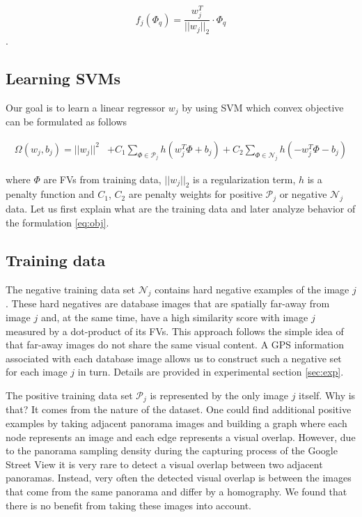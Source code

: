 \documentclass[table]{article} %
\newcommand\norm[1]{||#1||_2}
\begin{document}
    \begin{equation}
    	f_j(\Phi_q)=\dfrac{w_j^T}{\norm{w_j}}\cdot \Phi_q
    	\label{eq:linreg}
    \end{equation}
    .

    \subsection{Learning SVMs}

    	 Our goal is to learn a linear regressor $w_j$ by using SVM which convex objective can be formulated as follows

    	\begin{align}
	        \Omega(w_j,b_j)=||w_j||^{2}& +C_1\sum_{\Phi\in \mathcal P_j}h(w_j^T\Phi+b_j)
	                         +C_2\sum_{\Phi\in \mathcal N_j}h(-w_j^T\Phi-b_j)
	       	\label{eq:obj} 
      	\end{align}

      	where $\Phi$ are FVs from training data, $\norm{w_j}$ is a regularization term, $h$ is a penalty function and $C_1$, $C_2$ are penalty weights for positive $\mathcal P_j$ or negative $\mathcal N_j$ data. Let us first explain what are the training data and later analyze behavior of the formulation \eqref{eq:obj}.
    \subsection{Training data}
      	The negative training data set $\mathcal N_j$ contains hard negative examples of the image $j$. These hard negatives are database images that are spatially far-away from image $j$ and, at the same time, have a high similarity score with image $j$ measured by a dot-product of its FVs. This approach follows the simple idea of \cite{Knopp2010} that far-away images do not share the same visual content. A GPS information associated with each database image allows us to construct such a negative set for each image $j$ in turn. Details are provided in experimental section \ref{sec:exp}.

      	The positive training data set $\mathcal P_j$ is represented by the only image $j$ itself. Why is that? It comes from the nature of the dataset. One could find additional positive examples by taking adjacent panorama images and building a graph where each node represents an image and each edge represents a visual overlap. However, due to the panorama sampling density during the capturing process of the Google Street View it is very rare to detect a visual overlap between two adjacent panoramas. Instead, very often the detected visual overlap is between the images that come from the same panorama and differ by a homography. We found that there is no benefit from taking these images into account.
\end{document}
